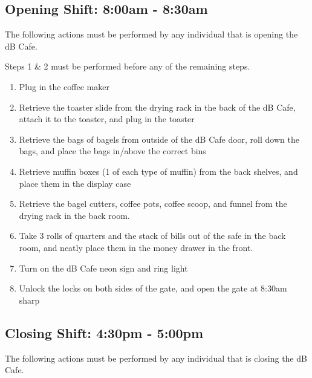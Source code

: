 \documentclass[12pt,onecolumn,letterpaper]{article}
\begin{document}
\subsection{Opening Shift: 8:00am - 8:30am}
The following actions must be performed by any individual that is opening the dB Cafe.

Steps 1 \& 2 must be performed before any of the remaining steps.
\begin{enumerate}
\item Plug in the coffee maker
\item Retrieve the toaster slide from the drying rack in the back of the dB Cafe, attach it to the toaster, and plug in the toaster 
\item Retrieve the bags of bagels from outside of the dB Cafe door, roll down the bags, and place the bags in/above the correct bins
\item Retrieve muffin boxes (1 of each type of muffin) from the back shelves, and place them in the display case
\item Retrieve the bagel cutters, coffee pots, coffee scoop, and funnel from the drying rack in the back room.
\item Take 3 rolls of quarters and the stack of bills out of the safe in the back room, and neatly place them in the money drawer in the front.
\item Turn on the dB Cafe neon sign and ring light
\item Unlock the locks on both sides of the gate, and open the gate at 8:30am sharp
\end{enumerate}
\subsection{Closing Shift: 4:30pm - 5:00pm}
The following actions must be performed by any individual that is closing the dB Cafe.
\end{document}
